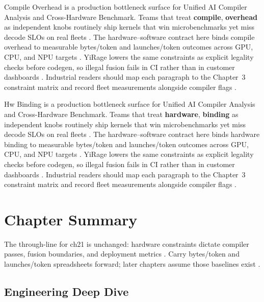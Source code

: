 Compile Overhead is a production bottleneck surface for Unified AI Compiler Analysis and Cross-Hardware Benchmark. Teams that treat \textbf{compile}, \textbf{overhead} as independent knobs routinely ship kernels that win microbenchmarks yet miss decode SLOs on real fleets \citep{nvidia2022hopper,amd2024aie}. The hardware--software contract here binds compile overhead to measurable bytes/token and launches/token outcomes across GPU, CPU, and NPU targets \citep{semianalysis2024tma,dlbook}. YiRage lowers the same constraints as explicit legality checks before codegen, so illegal fusion fails in CI rather than in customer dashboards \citep{amd2024xdna,dao2022flashattention}. Industrial readers should map each paragraph to the Chapter~3 constraint matrix and record fleet measurements alongside compiler flags \citep{amd2024aie,kwon2023vllm}.

Hw Binding is a production bottleneck surface for Unified AI Compiler Analysis and Cross-Hardware Benchmark. Teams that treat \textbf{hardware}, \textbf{binding} as independent knobs routinely ship kernels that win microbenchmarks yet miss decode SLOs on real fleets \citep{semianalysis2024tma,dlbook}. The hardware--software contract here binds hardware binding to measurable bytes/token and launches/token outcomes across GPU, CPU, and NPU targets \citep{amd2024xdna,dao2022flashattention}. YiRage lowers the same constraints as explicit legality checks before codegen, so illegal fusion fails in CI rather than in customer dashboards \citep{amd2024aie,kwon2023vllm}. Industrial readers should map each paragraph to the Chapter~3 constraint matrix and record fleet measurements alongside compiler flags \citep{dlbook,nvidia2024cudagraphs}.

\section{Chapter Summary}
\label{sec:ch21_summary}

The through-line for ch21 is unchanged: hardware constraints dictate compiler passes, fusion boundaries, and deployment metrics \citep{memoryfloor2026,amd2024xdna}. Carry bytes/token and launches/token spreadsheets forward; later chapters assume those baselines exist \citep{semianalysis2024tma,dlbook}.


\subsection{Engineering Deep Dive}
\label{sec:ch21_deep_dive}

